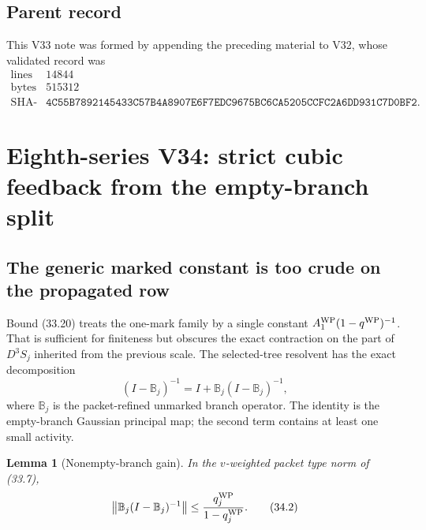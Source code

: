 \documentclass[11pt,oneside]{book}
\newtheorem{lemma}[theorem]{Lemma}
\theoremstyle{definition}
\theoremstyle{remark}
\begin{document}
\subsection{Parent record}

This V33 note was formed by appending the preceding material to V32,
whose validated record was
\[
\begin{array}{c|c}
\text{lines}&14844\\
\text{bytes}&515312\\
\text{SHA-256}&
\texttt{4C55B7892145433C57B4A8907E6F7EDC9675BC6CA5205CCFC2A6DD931C7D0BF2}.
\end{array}
\]



\section{Eighth-series V34: strict cubic feedback from the empty-branch
split}

\subsection{The generic marked constant is too crude on the propagated row}

Bound (33.20) treats the one-mark family by a single constant
\(A_1^{\rm WP}(1-q^{\rm WP})^{-1}\).  That is sufficient for
finiteness but obscures the exact contraction on the part of
\(D^3S_j\) inherited from the previous scale.  The selected-tree
resolvent has the exact decomposition
\[
 (I-{\mathbb B}_j)^{-1}
 =
 I+{\mathbb B}_j(I-{\mathbb B}_j)^{-1},                          \tag{34.1}
\]
where \({\mathbb B}_j\) is the packet-refined unmarked branch
operator.  The identity is the empty-branch Gaussian principal map;
the second term contains at least one small activity.

\begin{lemma}[Nonempty-branch gain]
\label{lem:e8v34-nonempty}
In the \(v\)-weighted packet type norm of (33.7),
\[
 \left\|
 {\mathbb B}_j(I-{\mathbb B}_j)^{-1}
 \right\|
 \leq
 \frac{q_j^{\rm WP}}{1-q_j^{\rm WP}}.                            \tag{34.2}
\]
\end{lemma}
\end{document}
